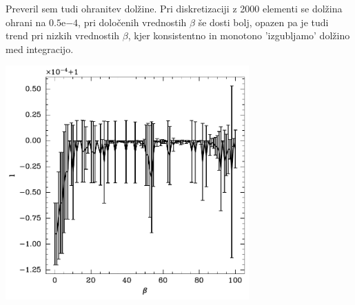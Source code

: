 Preveril sem tudi ohranitev dolžine. Pri diskretizaciji z 2000 elementi se dolžina ohrani na $0.5\mathrm{e}{-4}$, pri določenih vrednostih $\beta$ še dosti bolj, opazen pa je tudi trend pri nizkih vrednostih $\beta$, kjer konsistentno in monotono 'izgubljamo' dolžino med integracijo.
\begin{center}
    \includegraphics[width=0.7\textwidth]{../images/2024-1-ohranitev_dolzine.pdf}
\end{center}
